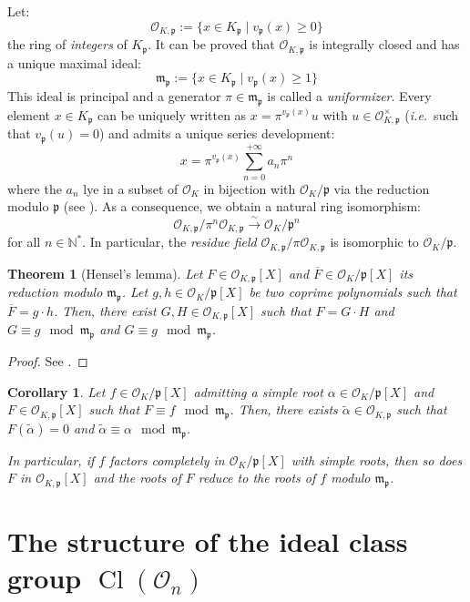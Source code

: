 \documentclass[a4paper,10pt]{report}
\theoremstyle{definition}
\theoremstyle{plain}
\newtheorem{corollary}[definition]{Corollary}
\newtheorem{theorem}[definition]{Theorem}
\theoremstyle{definition}
\newcommand{\ie}{\emph{i.e.}\ }
\newcommand{\N}{\mathbb{N}}
\newcommand{\mO}{\mathcal{O}}
\renewcommand{\(}{\left(}
\renewcommand{\)}{\right)}
\newcommand{\mf}[1]{\mathfrak{#1}}
\DeclareMathOperator{\Cl}{Cl}
\begin{document}
Let:
\[\mO_{K,\mf{p}}:=\{x\in K_{\mf{p}}\mid v_{\mf{p}}(x)\geq 0\}\]
the ring of \emph{integers} of $K_{\mf{p}}$. It can be proved that $\mO_{K,\mf{p}}$ is integrally closed and has a unique maximal ideal:
\[\mf{m}_{\mf{p}}:=\{x\in K_{\mf{p}}\mid v_{\mf{p}}(x)\geq 1\}\]
This ideal is principal and a generator $\pi\in\mf{m}_{\mf{p}}$ is called a \emph{uniformizer}. Every element $x\in K_{\mf{p}}$ can be uniquely written as $x=\pi^{v_{\mf{p}}(x)}u$ with $u\in \mO_{K,\mf{p}}^\times$ (\ie such that $v_{\mf{p}}(u)=0$) and admits a unique series development:
\[x=\pi^{v_{\mf{p}}(x)}\sum_{n=0}^{+\infty} a_n\pi^n\]
where the $a_n$ lye in a subset of $\mO_K$ in bijection with $\mO_K/\mf{p}$ via the reduction modulo $\mf{p}$ (see \cite[proposition II.2.8]{Janusz}). As a consequence, we obtain a natural ring isomorphism:
\[\mO_{K,\mf{p}}/\pi^n\mO_{K,\mf{p}}\overset{\sim}{\longrightarrow}\mO_K/\mf{p}^n\]
for all $n\in\N^*$. In particular, the \emph{residue field} $\mO_{K,\mf{p}}/\pi\mO_{K,\mf{p}}$ is isomorphic to $\mO_K/\mf{p}$.

\begin{theorem}[Hensel's lemma]\label{theorem 9}
Let $F\in \mO_{K,\mf{p}}[X]$ and $\overline{F}\in\mO_K/\mf{p}[X]$ its reduction modulo $\mf{m}_{\mf{p}}$. Let $g,h\in \mO_K/\mf{p}[X]$ be two coprime polynomials such that $\overline{F}=g\cdot h$. Then, there exist $G,H\in \mO_{K,\mf{p}}[X]$ such that $F=G\cdot H$ and $G\equiv g \mod \mf{m}_{\mf{p}}$ and $G\equiv g \mod \mf{m}_{\mf{p}}$.
\end{theorem}

\begin{proof}
See \cite[lemma II.3.5]{Janusz}.
\end{proof}

\begin{corollary}\label{corollary 3}
Let $f\in \mO_K/\mf{p}[X]$ admitting a simple root $\alpha\in \mO_K/\mf{p}[X]$ and $F\in \mO_{K,\mf{p}}[X]$ such that $F\equiv f \mod \mf{m}_{\mf{p}}$. Then, there exists $\tilde{\alpha}\in \mO_{K,\mf{p}}$ such that $F(\tilde{\alpha})=0$ and $\tilde{\alpha}\equiv \alpha \mod \mf{m}_{\mf{p}}$. 

In particular, if $f$ factors completely in $\mO_K/\mf{p}[X]$ with simple roots, then so does $F$ in $\mO_{K,\mf{p}}[X]$ and the roots of $F$ reduce to the roots of $f$ modulo $\mf{m}_{\mf{p}}$.
\end{corollary}

\section{The structure of the ideal class group $\Cl(\mO_n)$}\label{appendix 1}
\end{document}
